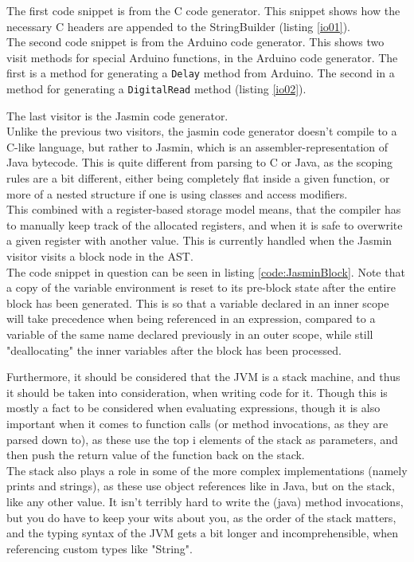 The first code snippet is from the C code generator. This snippet shows how the necessary C headers are appended to the StringBuilder (listing \ref{io01}).\\

\noindent\newline
The second code snippet is from the Arduino code generator. This shows two visit methods for special Arduino functions, in the Arduino code generator. The first is a method for generating a \texttt{Delay} method from Arduino. The second in a method for generating a \texttt{DigitalRead} method (listing \ref{io02}).

\noindent\newline
The last visitor is the Jasmin code generator.\\
Unlike the previous two visitors, the jasmin code generator doesn't compile to a C-like language, but rather to Jasmin, which is an assembler-representation of Java bytecode. This is quite different from parsing to C or Java, as the scoping rules are a bit different, either being completely flat inside a given function, or more of a nested structure if one is using classes and access modifiers.\\
This combined with a register-based storage model means, that the compiler has to manually keep track of the allocated registers, and when it is safe to overwrite a given register with another value. This is currently handled when the Jasmin visitor visits a block node in the AST.\\
The code snippet in question can be seen in listing \ref{code:JasminBlock}. Note that a copy of the variable environment is reset to its pre-block state after the entire block has been generated. This is so that a variable declared in an inner scope will take precedence when being referenced in an expression, compared to a variable of the same name declared previously in an outer scope, while still "deallocating" the inner variables after the block has been processed.

\noindent\newline
Furthermore, it should be considered that the JVM is a stack machine, and thus it should be taken into consideration, when writing code for it. Though this is mostly a fact to be considered when evaluating expressions, though it is also important when it comes to function calls (or method invocations, as they are parsed down to), as these use the top i elements of the stack as parameters, and then push the return value of the function back on the stack.\\
The stack also plays a role in some of the more complex implementations (namely prints and strings), as these use object references like in Java, but on the stack, like any other value. It isn't terribly hard to write the (java) method invocations, but you do have to keep your wits about you, as the order of the stack matters, and the typing syntax of the JVM gets a bit longer and incomprehensible, when referencing custom types like "String".